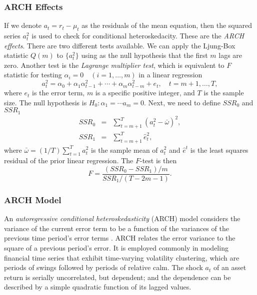 \subsubsection{ARCH Effects}
If we denote $a_t = r_t - \mu_t$ as the residuals of the mean equation, then the squared series $a^2_t$ is used to check for conditional heteroskedacity. These are the \emph{ARCH effects}. There are two different tests available. We can apply the Ljung-Box statistic $Q(m)$ to  $\{a^2_t\}$ using as the null hypothesis that the first $m$ lags are zero. Another test is the \emph{Lagrange multiplier test}, which is equivalent to $F$ statistic for testing $\alpha_i=0 \quad (i=1,\ldots,m)$ in a linear regression
\[
a^2_t = \alpha_0 +\alpha_1 \alpha^2_{t-1}+\cdots+\alpha_m\alpha^2_{t-m}+e_t, \quad 
t=m+1,\ldots,T,
\]
where $e_t$ is the error term, $m$ is a specific positive integer, and $T$ is the sample size. The null hypothesis is $H_0: \alpha_1= \cdots a_m = 0$. Next, we need to define $SSR_0$ and $SSR_1$
\begin{eqnarray*}
SSR_0 &=& \sum^T_{t=m+1} (a^2_t - \bar{\omega})^2, \\
SSR_1 &=& \sum^T_{t=m+1} \hat{e}^2_t, 
\end{eqnarray*}
where $\bar{\omega}=(1/T)\sum^T_{t=1}a^2_t$ is the sample mean of $a^2_t$ and  $\hat{e}^t$ is the least squares residual of the prior linear regression. The $F$-test is then
\[
F=\frac{(SSR_0-SSR_1)/m}{SSR_1/(T-2m-1)}.
\]

\subsubsection{ARCH Model}
An \emph{autoregressive conditional heteroskedasticity} (ARCH) model considers the variance of the current error term to be a function of the variances of the previous time period's error terms \cite{engle1982arch}.  ARCH relates the error variance to the square of a previous period's error. It is employed commonly in modeling financial time series that exhibit time-varying volatility clustering, which are periods of swings followed by periods of relative calm. The shock $a_t$ of an asset return is serially uncorrelated, but dependent; and the dependence can be described by a simple quadratic function of its lagged values.


